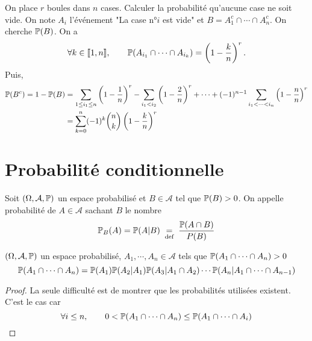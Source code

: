 \begin{ex}
    On place $r$ boules dans $n$ cases. Calculer la probabilité qu'aucune case ne soit vide. On note $A_i$ l'événement "La case n°$i$ est vide" et $B=A_1^c\cap \cdots \cap A_n^c$. On cherche $\P(B)$. On a \[
        \forall k \in  \llbracket 1, n\rrbracket, \qquad \P(A_{i_1}\cap \cdots \cap A_{i_k})= \left( 1-\frac{k}{n} \right) ^r.
    \] 
    Puis, \begin{align*}
        \P(B^c)=1-\P(B)&=\sum_{1\leq i_1\leq n} \left( 1-\frac{1}{n} \right) ^r-\sum_{i_1<i_2} \left( 1-\frac{2}{n} \right) ^r+\cdots +(-1)^{n-1} \sum_{i_1<\cdots <i_n} \left( 1-\frac{n}{n} \right) ^r\\
                       &=\sum_{k=0}^n(-1)^k\binom nk \left( 1-\frac{k}{n} \right) ^r
    \end{align*}
\end{ex}

\section{Probabilité conditionnelle}

\begin{dfn}
    Soit $(\Omega, \mathcal A, \P)$ un espace probabilisé et $B\in \mathcal A$ tel que $\P(B)>0$. On appelle probabilité de $A \in \mathcal A$ sachant $B$ le nombre  \[
        \P_B(A)=\P(A|B)\defeq \frac{\P(A\cap B)}{P(B)}
    \] 
\end{dfn}

\begin{prop}
    \Hyp $(\Omega, \mathcal A, \P)$ un espace probabilisé, $A_1, \cdots , A_n \in  \mathcal A$ tels que $\P(A_1 \cap \cdots \cap A_n)>0$
    \Conc \[
        \P(A_1\cap \cdots \cap A_n)=\P(A_1)\P(A_2|A_1)\P(A_3|A_1\cap A_2)\cdots \P(A_n|A_1\cap\cdots\cap A_{n-1})
    \] 
\end{prop}

\begin{proof}
    La seule difficulté est de montrer que les probabilités utilisées existent. C'est le cas car \[
        \forall i\leq n, \qquad 0<\P(A_1\cap\cdots\cap A_n)\leq \P(A_1\cap \cdots \cap A_i)
    \] 
\end{proof}

